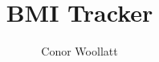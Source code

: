 \documentclass{report}
\begin{document}
\title{BMI Tracker}
\author{Conor Woollatt}
\maketitle
\tableofcontents






\end{document}
